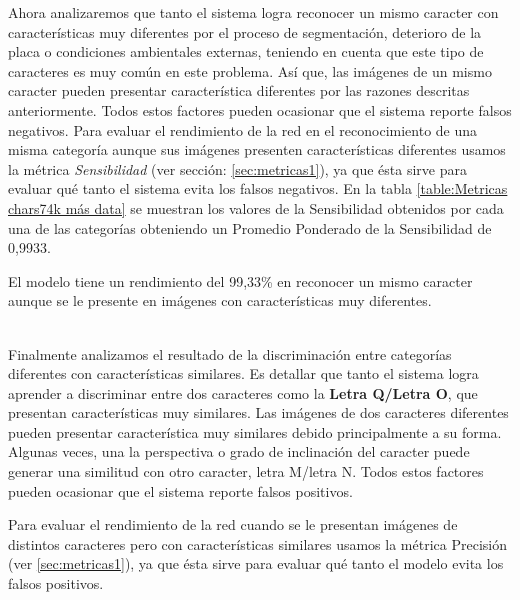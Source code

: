 Ahora analizaremos que tanto el sistema logra reconocer un mismo caracter con características muy diferentes por el proceso de segmentación, deterioro de la placa o condiciones ambientales externas, teniendo en cuenta que este tipo de caracteres es muy común en este problema. Así que, las imágenes de un mismo caracter pueden presentar característica diferentes por las razones descritas anteriormente. Todos estos factores pueden ocasionar que el sistema reporte falsos negativos. Para evaluar el rendimiento de la red en el reconocimiento de una misma categoría aunque sus imágenes presenten características diferentes usamos la métrica \emph{Sensibilidad} (ver sección: \ref{sec:metricas1}), ya que ésta sirve para evaluar qué tanto el sistema evita los falsos negativos. 
En la tabla \ref{table:Metricas chars74k más data} se muestran los valores de la Sensibilidad obtenidos por cada una de las categorías obteniendo un Promedio Ponderado de la Sensibilidad de 0,9933. \\

\begin{tcolorbox}
[colback=blue!5!white,colframe=blue!45!black,fonttitle=\bfseries,title=Conclusión]
   El modelo tiene un rendimiento del 99,33\% en reconocer un mismo caracter aunque se le presente en imágenes con características muy diferentes.
\end{tcolorbox}\\

Finalmente analizamos el resultado de la discriminación entre categorías diferentes con características similares. Es detallar que tanto el sistema logra aprender a discriminar entre dos caracteres como la \textbf{Letra Q/Letra O}, que presentan características muy similares.  Las imágenes de dos caracteres diferentes pueden presentar característica muy similares debido principalmente a su forma. Algunas veces, una la perspectiva o grado de inclinación del caracter puede generar una similitud con otro caracter, letra M/letra N. Todos estos factores pueden ocasionar que el sistema reporte falsos positivos.

Para evaluar el rendimiento de la red cuando se le presentan imágenes de distintos caracteres pero con características similares usamos la métrica Precisión (ver \ref{sec:metricas1}), ya que ésta sirve para evaluar qué tanto el modelo evita los falsos positivos.

